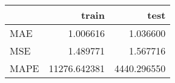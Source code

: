 \begin{tabular}{lrr}
\toprule
{} &         train &         test \\
\midrule
MAE  &      1.006616 &     1.036600 \\
MSE  &      1.489771 &     1.567716 \\
MAPE &  11276.642381 &  4440.296550 \\
\bottomrule
\end{tabular}
